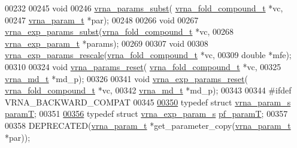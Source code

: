 \begin{DoxyCode}
00232 
00245 \textcolor{keywordtype}{void}
00246 \hyperlink{group__energy__parameters_ga5d1909208f7ea3baa98b75afaa1f62ca}{vrna\_params\_subst}( \hyperlink{group__fold__compound_structvrna__fc__s}{vrna\_fold\_compound\_t} *vc,
00247                     \hyperlink{group__energy__parameters_structvrna__param__s}{vrna\_param\_t} *par);
00248 
00266 \textcolor{keywordtype}{void}
00267 \hyperlink{group__energy__parameters_ga8e7ac4fab3b0cc03afbc134eaafb3525}{vrna\_exp\_params\_subst}(\hyperlink{group__fold__compound_structvrna__fc__s}{vrna\_fold\_compound\_t} *vc,
00268                       \hyperlink{group__energy__parameters_structvrna__exp__param__s}{vrna\_exp\_param\_t} *params);
00269 
00307 \textcolor{keywordtype}{void}
00308 \hyperlink{group__energy__parameters_gad607bc3a5b5da16400e2ca4ea5560233}{vrna\_exp\_params\_rescale}(\hyperlink{group__fold__compound_structvrna__fc__s}{vrna\_fold\_compound\_t} *vc,
00309                         \textcolor{keywordtype}{double} *mfe);
00310 
00324 \textcolor{keywordtype}{void} \hyperlink{group__energy__parameters_gac40dc82e48a72a97cfc58b9da08a7792}{vrna\_params\_reset}( \hyperlink{group__fold__compound_structvrna__fc__s}{vrna\_fold\_compound\_t} *vc,
00325                         \hyperlink{group__model__details_structvrna__md__s}{vrna\_md\_t} *md\_p);
00326 
00341 \textcolor{keywordtype}{void} \hyperlink{group__energy__parameters_gaa5409218068be84d7b50c78fbdaa85a9}{vrna\_exp\_params\_reset}( \hyperlink{group__fold__compound_structvrna__fc__s}{vrna\_fold\_compound\_t} *vc,
00342                             \hyperlink{group__model__details_structvrna__md__s}{vrna\_md\_t} *md\_p);
00343 
00344 \textcolor{preprocessor}{#ifdef  VRNA\_BACKWARD\_COMPAT}
00345 
\hypertarget{params_8h_source.tex_l00350}{}\hyperlink{group__energy__parameters_ga857dde86357d306cc902f0d8b2797659}{00350} \textcolor{keyword}{typedef} \textcolor{keyword}{struct }\hyperlink{group__energy__parameters_structvrna__param__s}{vrna\_param\_s}     \hyperlink{group__energy__parameters_structvrna__param__s}{paramT};
00351 
\hypertarget{params_8h_source.tex_l00356}{}\hyperlink{group__energy__parameters_ga8bffe1828e2cbec101769f5cc0b1535b}{00356} \textcolor{keyword}{typedef} \textcolor{keyword}{struct }\hyperlink{group__energy__parameters_structvrna__exp__param__s}{vrna\_exp\_param\_s} \hyperlink{group__energy__parameters_structvrna__exp__param__s}{pf\_paramT};
00357 
00358 DEPRECATED(\hyperlink{group__energy__parameters_structvrna__param__s}{vrna\_param\_t} *get\_parameter\_copy(\hyperlink{group__energy__parameters_structvrna__param__s}{vrna\_param\_t} *par));

\end{DoxyCode}
